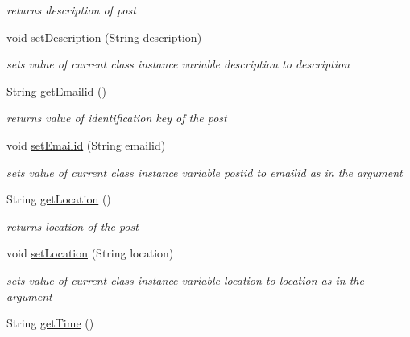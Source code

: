 \begin{DoxyCompactItemize}
\begin{DoxyCompactList}\small\item\em returns description of post \end{DoxyCompactList}\item 
void \hyperlink{classcom_1_1example_1_1sel_1_1lostfound_1_1Posts_afe522ce2d830e03ee863570dafb7de5e}{set\-Description} (\-String description)
\begin{DoxyCompactList}\small\item\em sets value of current class instance variable description to description \end{DoxyCompactList}\item 
\hypertarget{classcom_1_1example_1_1sel_1_1lostfound_1_1Posts_ae345fee1fea9e5ce23ee7f237c953907}{\-String \hyperlink{classcom_1_1example_1_1sel_1_1lostfound_1_1Posts_ae345fee1fea9e5ce23ee7f237c953907}{get\-Emailid} ()}\label{classcom_1_1example_1_1sel_1_1lostfound_1_1Posts_ae345fee1fea9e5ce23ee7f237c953907}

\begin{DoxyCompactList}\small\item\em returns value of identification key of the post \end{DoxyCompactList}\item 
void \hyperlink{classcom_1_1example_1_1sel_1_1lostfound_1_1Posts_ac6e82ad0b181a7d3252fe03cabaef73c}{set\-Emailid} (\-String emailid)
\begin{DoxyCompactList}\small\item\em sets value of current class instance variable postid to emailid as in the argument \end{DoxyCompactList}\item 
\hypertarget{classcom_1_1example_1_1sel_1_1lostfound_1_1Posts_a86ee46db0162dbda5aeb4896d6ea89ea}{\-String \hyperlink{classcom_1_1example_1_1sel_1_1lostfound_1_1Posts_a86ee46db0162dbda5aeb4896d6ea89ea}{get\-Location} ()}\label{classcom_1_1example_1_1sel_1_1lostfound_1_1Posts_a86ee46db0162dbda5aeb4896d6ea89ea}

\begin{DoxyCompactList}\small\item\em returns location of the post \end{DoxyCompactList}\item 
void \hyperlink{classcom_1_1example_1_1sel_1_1lostfound_1_1Posts_a19252b7b73e18ca811227a3d7dff742d}{set\-Location} (\-String location)
\begin{DoxyCompactList}\small\item\em sets value of current class instance variable location to location as in the argument \end{DoxyCompactList}\item 
\hypertarget{classcom_1_1example_1_1sel_1_1lostfound_1_1Posts_a5d0c591e7e082a9ca0bbb828165fa0f0}{\-String \hyperlink{classcom_1_1example_1_1sel_1_1lostfound_1_1Posts_a5d0c591e7e082a9ca0bbb828165fa0f0}{get\-Time} ()}\label{classcom_1_1example_1_1sel_1_1lostfound_1_1Posts_a5d0c591e7e082a9ca0bbb828165fa0f0}


\end{DoxyCompactItemize}
